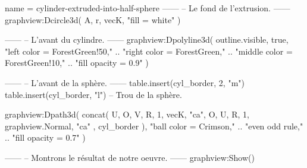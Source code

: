 \documentclass{standalone}
\begin{document}
\begin{luadraw}{name = cylinder-extruded-into-half-sphere}
------
-- Le fond de l'extrusion.
------
graphview:Dcircle3d(
  A, r, vecK,
  "fill = white"
)

------
-- L'avant du cylindre.
------
graphview:Dpolyline3d(
  outline.visible,
  true,
     "left color = ForestGreen!50,"
  .. "right color = ForestGreen,"
  .. "middle color = ForestGreen!10,"
  .. "fill opacity = 0.9"
)

------
-- L'avant de la sphère.
------
table.insert(cyl_border, 2, "m")
table.insert(cyl_border, "l") -- Trou de la sphère.

graphview:Dpath3d(
  concat(
    {
      U, O, V, R, 1, vecK, "ca",
      O, U, R, 1, graphview.Normal, "ca"
    },
    cyl_border
  ),
     "ball color = Crimson,"
  .. "even odd rule,"
  .. "fill opacity = 0.7"
)

------
-- Montrons le résultat de notre oeuvre.
------
graphview:Show()
\end{luadraw}
\end{document}
